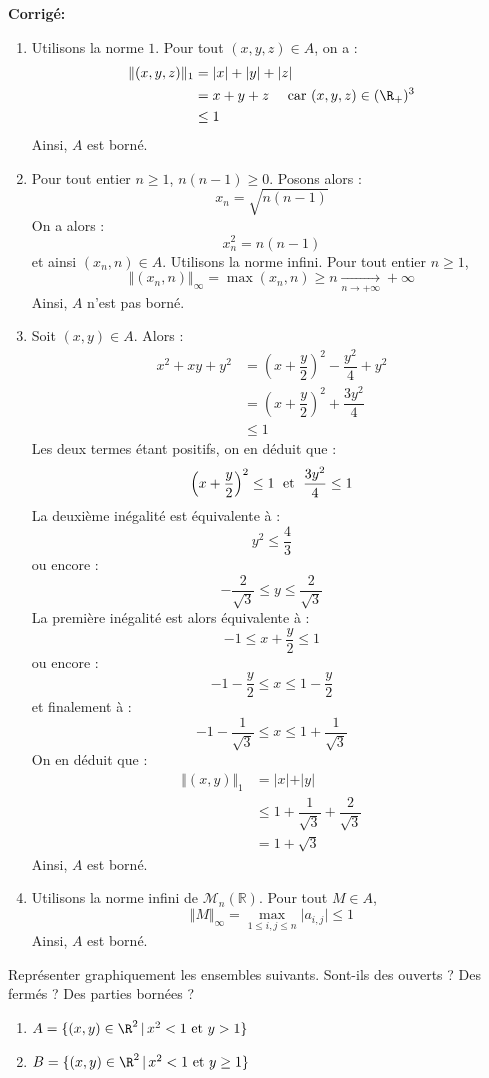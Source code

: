 \documentclass[a4paper,twoside,french,11pt]{VcCours}
\newcommand{\corr}{\textbf{Corrigé:}}
\begin{document}
\corr 
\begin{enumerate}
\item Utilisons la norme $1$. Pour tout $(x,y,z) \in A$, on a :
\begin{align*}
\Vert (x,y,z) \Vert_1 & = \vert x \vert + \vert y \vert + \vert z \vert \\
& = x+y+z \quad \hbox{ car } (x,y,z) \in  (\R_+)^3 \\
&  \leq 1
\end{align*}
Ainsi, $A$ est borné.
\item Pour tout entier $n \geq 1$, $ n(n-1) \geq 0$. Posons alors :
$$ x_n = \sqrt{n(n-1)}$$
On a alors :
$$ x_n^2= n(n-1)$$
et ainsi $(x_n,n) \in A$. Utilisons la norme infini. Pour tout entier $n \geq 1$,
$$ \Vert (x_n,n) \Vert_{\infty} = \max(x_n,n) \geq n \underset{n \rightarrow + \infty}{\longrightarrow} + \infty$$
Ainsi, $A$ n'est pas borné.
\item Soit $(x,y) \in A$. Alors :
\begin{align*}
x^2+xy+y^2 & = \left( x+\dfrac{y}{2}  \right)^2 - \dfrac{y^2}{4}+ y^2 \\
& = \left( x+\dfrac{y}{2}  \right)^2  + \dfrac{3y^2}{4} \\
& \leq 1
\end{align*}
Les deux termes étant positifs, on en déduit que :
$$ \left( x+\dfrac{y}{2}  \right)^2 \leq 1 \; \hbox{ et } \; \dfrac{3y^2}{4} \leq 1 $$
La deuxième inégalité est équivalente à :
$$ y^2 \leq \dfrac{4}{3}$$
ou encore :
$$ - \dfrac{2}{\sqrt{3}} \leq y \leq \dfrac{2}{\sqrt{3}}$$
La première inégalité est alors équivalente à :
$$ -1 \leq x+\dfrac{y}{2} \leq 1 $$
ou encore :
$$ -1 - \dfrac{y}{2} \leq x \leq 1- \dfrac{y}{2}$$
et finalement à :
$$ -1 - \dfrac{1}{\sqrt{3}} \leq x \leq 1 + \dfrac{1}{\sqrt{3}}$$
On en déduit que :
\begin{align*}
\Vert (x,y) \Vert_1 & = \vert x \vert + \vert y \vert \\
& \leq 1+ \dfrac{1}{\sqrt{3}} + \dfrac{2}{\sqrt{3}} \\
& = 1 + \sqrt{3}
\end{align*}
Ainsi, $A$ est borné.
\item Utilisons la norme infini de $\mathcal{M}_n(\mathbb{R})$. Pour tout $M \in A$,
$$ \Vert M \Vert_{\infty} = \max_{1 \leq i,j \leq n} \vert a_{i,j} \vert  \leq 1$$
Ainsi, $A$ est borné.
\end{enumerate}

\begin{Exercice}{} Représenter graphiquement les ensembles suivants. Sont-ils des ouverts ? Des fermés ? Des parties bornées ?
\begin{enumerate}
\item $A = \lbrace (x,y)\in\R^2 \, \vert \, x^2 < 1 \hbox{ et } y> 1\rbrace$
\item $B = \lbrace (x,y)\in\R^2 \, \vert \, x^2 < 1 \hbox{ et } y \geq 1\rbrace$
\end{enumerate}
\end{Exercice}
\end{document}
